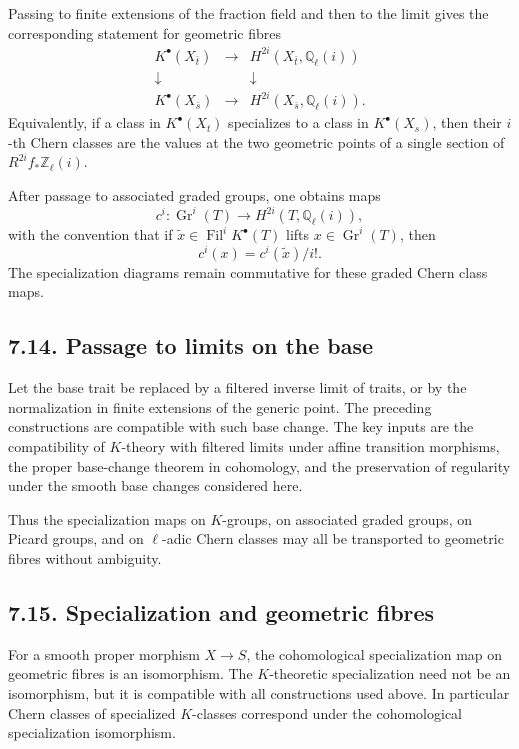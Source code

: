\documentclass[11pt]{article}
\theoremstyle{plain}
\theoremstyle{definition}
\theoremstyle{remark}
\newcommand{\QQ}{\mathbb Q}
\newcommand{\ZZ}{\mathbb Z}
\DeclareMathOperator{\Gr}{Gr}
\newcommand{\longto}{\longrightarrow}
\providecommand{\Filt}{\operatorname{Fil}}
\begin{document}
Passing to finite extensions of the fraction field and then to the limit gives the corresponding statement for geometric fibres
\[
\begin{array}{ccc}
K^\bullet(X_{\bar t})&\longto&H^{2i}(X_{\bar t},\QQ_\ell(i))\\
\downarrow&&\downarrow\\
K^\bullet(X_{\bar s})&\longto&H^{2i}(X_{\bar s},\QQ_\ell(i)).
\end{array}
\]
Equivalently, if a class in $K^\bullet(X_t)$ specializes to a class in $K^\bullet(X_s)$, then their $i$-th Chern classes are the values at the two geometric points of a single section of $R^{2i}f_*\ZZ_\ell(i)$.

After passage to associated graded groups, one obtains maps
\[
c^i:\Gr^i(T)\longto H^{2i}(T,\QQ_\ell(i)),
\]
with the convention that if $\tilde x\in\Filt^iK^\bullet(T)$ lifts $x\in\Gr^i(T)$, then
\[
c^i(x)=c^i(\tilde x)/i!.
\]
The specialization diagrams remain commutative for these graded Chern class maps.

\subsection*{7.14. Passage to limits on the base}

Let the base trait be replaced by a filtered inverse limit of traits, or by the normalization in finite extensions of the generic point. The preceding constructions are compatible with such base change. The key inputs are the compatibility of $K$-theory with filtered limits under affine transition morphisms, the proper base-change theorem in cohomology, and the preservation of regularity under the smooth base changes considered here.

Thus the specialization maps on $K$-groups, on associated graded groups, on Picard groups, and on $\ell$-adic Chern classes may all be transported to geometric fibres without ambiguity.

\subsection*{7.15. Specialization and geometric fibres}

For a smooth proper morphism $X\to S$, the cohomological specialization map on geometric fibres is an isomorphism. The $K$-theoretic specialization need not be an isomorphism, but it is compatible with all constructions used above. In particular Chern classes of specialized $K$-classes correspond under the cohomological specialization isomorphism.
\end{document}
